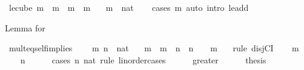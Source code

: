 \begin{isabellebody}
\isanewline
%
\endisadelimproof
\isanewline
{}\isamarkupfalse%
\ le{\isacharunderscore}{\kern0pt}cube{\isacharcolon}{\kern0pt}\ {\isachardoublequoteopen}m\ {\isasymle}\ m\ {\isacharasterisk}{\kern0pt}\ {\isacharparenleft}{\kern0pt}m\ {\isacharasterisk}{\kern0pt}\ m{\isacharparenright}{\kern0pt}{\isachardoublequoteclose}\isanewline
\ \ \ m\ {\isacharcolon}{\kern0pt}{\isacharcolon}{\kern0pt}\ nat\isanewline
%
\isadelimproof
\ \ %
\endisadelimproof
%
\isatagproof
{}\isamarkupfalse%
\ {\isacharparenleft}{\kern0pt}cases\ m{\isacharparenright}{\kern0pt}\ {\isacharparenleft}{\kern0pt}auto\ intro{\isacharcolon}{\kern0pt}\ le{\isacharunderscore}{\kern0pt}add{}{\isacharparenright}{\kern0pt}%
\endisatagproof
{\isafoldproof}%
%
\isadelimproof
%
\endisadelimproof
%
\begin{isamarkuptext}%
Lemma for %
\end{isamarkuptext}\isamarkuptrue%
\isamarkupfalse%
\ mult{\isacharunderscore}{\kern0pt}eq{\isacharunderscore}{\kern0pt}self{\isacharunderscore}{\kern0pt}implies{\isacharunderscore}{\kern0pt}{}{}{\isacharcolon}{\kern0pt}\ \isanewline
\ \ \ m\ n\ {\isacharcolon}{\kern0pt}{\isacharcolon}{\kern0pt}\ nat\isanewline
\ \ \ {\isachardoublequoteopen}m\ {\isacharequal}{\kern0pt}\ m\ {\isacharasterisk}{\kern0pt}\ n{\isachardoublequoteclose}\ \ {\isachardoublequoteopen}n\ {\isacharequal}{\kern0pt}\ {}\ {\isasymor}\ m\ {\isacharequal}{\kern0pt}\ {}{\isachardoublequoteclose}\isanewline
%
\isadelimproof
%
\endisadelimproof
%
\isatagproof
{}\isamarkupfalse%
\ {\isacharparenleft}{\kern0pt}rule\ disjCI{\isacharparenright}{\kern0pt}\isanewline
\ \ \isamarkupfalse%
\ {\isachardoublequoteopen}m\ {\isasymnoteq}\ {}{\isachardoublequoteclose}\isanewline
\ \ \isamarkupfalse%
\ {\isachardoublequoteopen}n\ {\isacharequal}{\kern0pt}\ {}{\isachardoublequoteclose}\isanewline
\ \ \isamarkupfalse%
\ {\isacharparenleft}{\kern0pt}cases\ n\ {\isachardoublequoteopen}{}{\isacharcolon}{\kern0pt}{\isacharcolon}{\kern0pt}nat{\isachardoublequoteclose}\ rule{\isacharcolon}{\kern0pt}\ linorder{\isacharunderscore}{\kern0pt}cases{\isacharparenright}{\kern0pt}\isanewline
\ \ \ \ \isamarkupfalse%
\ greater\isanewline
\ \ \ \ \isamarkupfalse%
\ {\isacharquery}{\kern0pt}thesis\isanewline
\ \ \ \ \ \ \isamarkupfalse%

\end{isabellebody}
